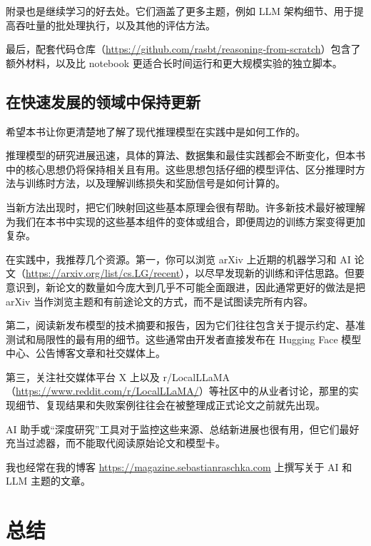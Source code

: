 附录也是继续学习的好去处。它们涵盖了更多主题，例如 LLM 架构细节、用于提高吞吐量的批处理执行，以及其他的评估方法。

最后，配套代码仓库（\href{https://github.com/rasbt/reasoning-from-scratch}{https://github.com/rasbt/reasoning-from-scratch}）包含了额外材料，以及比 notebook 更适合长时间运行和更大规模实验的独立脚本。

\subsection{在快速发展的领域中保持更新}

希望本书让你更清楚地了解了现代推理模型在实践中是如何工作的。

推理模型的研究进展迅速，具体的算法、数据集和最佳实践都会不断变化，但本书中的核心思想仍将保持相关且有用。这些思想包括仔细的模型评估、区分推理时方法与训练时方法，以及理解训练损失和奖励信号是如何计算的。

当新方法出现时，把它们映射回这些基本原理会很有帮助。许多新技术最好被理解为我们在本书中实现的这些基本组件的变体或组合，即便周边的训练方案变得更加复杂。

在实践中，我推荐几个资源。第一，你可以浏览 arXiv 上近期的机器学习和 AI 论文（\href{https://arxiv.org/list/cs.LG/recent}{https://arxiv.org/list/cs.LG/recent}），以尽早发现新的训练和评估思路。但要意识到，新论文的数量如今庞大到几乎不可能全面跟进，因此通常更好的做法是把 arXiv 当作浏览主题和有前途论文的方式，而不是试图读完所有内容。

第二，阅读新发布模型的技术摘要和报告，因为它们往往包含关于提示约定、基准测试和局限性的最有用的细节。这些通常由开发者直接发布在 Hugging Face 模型中心、公告博客文章和社交媒体上。

第三，关注社交媒体平台 X 上以及 r/LocalLLaMA（\href{https://www.reddit.com/r/LocalLLaMA/}{https://www.reddit.com/r/LocalLLaMA/}）等社区中的从业者讨论，那里的实现细节、复现结果和失败案例往往会在被整理成正式论文之前就先出现。

AI 助手或“深度研究”工具对于监控这些来源、总结新进展也很有用，但它们最好充当过滤器，而不能取代阅读原始论文和模型卡。

我也经常在我的博客 \href{https://magazine.sebastianraschka.com}{https://magazine.sebastianraschka.com} 上撰写关于 AI 和 LLM 主题的文章。

\section{总结}

